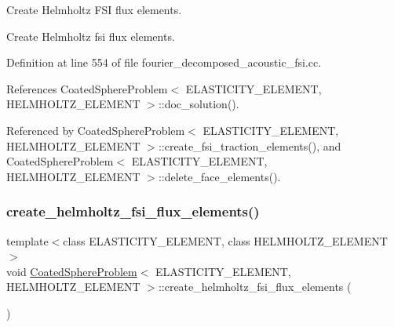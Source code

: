 Create Helmholtz F\+SI flux elements. 

Create Helmholtz fsi flux elements. 

Definition at line 554 of file fourier\+\_\+decomposed\+\_\+acoustic\+\_\+fsi.\+cc.



References Coated\+Sphere\+Problem$<$ E\+L\+A\+S\+T\+I\+C\+I\+T\+Y\+\_\+\+E\+L\+E\+M\+E\+N\+T, H\+E\+L\+M\+H\+O\+L\+T\+Z\+\_\+\+E\+L\+E\+M\+E\+N\+T $>$\+::doc\+\_\+solution().



Referenced by Coated\+Sphere\+Problem$<$ E\+L\+A\+S\+T\+I\+C\+I\+T\+Y\+\_\+\+E\+L\+E\+M\+E\+N\+T, H\+E\+L\+M\+H\+O\+L\+T\+Z\+\_\+\+E\+L\+E\+M\+E\+N\+T $>$\+::create\+\_\+fsi\+\_\+traction\+\_\+elements(), and Coated\+Sphere\+Problem$<$ E\+L\+A\+S\+T\+I\+C\+I\+T\+Y\+\_\+\+E\+L\+E\+M\+E\+N\+T, H\+E\+L\+M\+H\+O\+L\+T\+Z\+\_\+\+E\+L\+E\+M\+E\+N\+T $>$\+::delete\+\_\+face\+\_\+elements().

\mbox{\label{classCoatedSphereProblem_a9a301689052eefd53552aadc23ff893b}} 
\subsubsection{\texorpdfstring{create\+\_\+helmholtz\+\_\+fsi\+\_\+flux\+\_\+elements()}{create\_helmholtz\_fsi\_flux\_elements()}\hspace{0.1cm}{\footnotesize\ttfamily [2/2]}}
{\footnotesize\ttfamily template$<$class E\+L\+A\+S\+T\+I\+C\+I\+T\+Y\+\_\+\+E\+L\+E\+M\+E\+NT, class H\+E\+L\+M\+H\+O\+L\+T\+Z\+\_\+\+E\+L\+E\+M\+E\+NT$>$ \\
void \hyperlink{classCoatedSphereProblem}{Coated\+Sphere\+Problem}$<$ E\+L\+A\+S\+T\+I\+C\+I\+T\+Y\+\_\+\+E\+L\+E\+M\+E\+NT, H\+E\+L\+M\+H\+O\+L\+T\+Z\+\_\+\+E\+L\+E\+M\+E\+NT $>$\+::create\+\_\+helmholtz\+\_\+fsi\+\_\+flux\+\_\+elements (\begin{DoxyParamCaption}{ }\end{DoxyParamCaption})\hspace{0.3cm}{\ttfamily [private]}}



